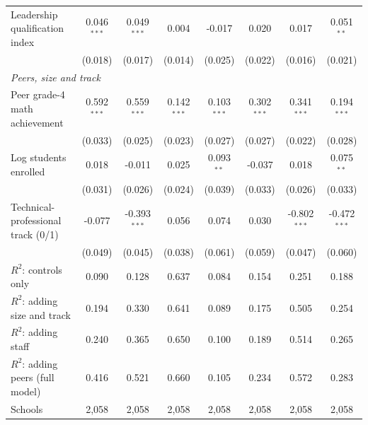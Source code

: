 \begin{table}[!htbp]
{\begin{tabular}{lccccccc}
\quad Leadership qualification index & 0.046$^{***}$ & 0.049$^{***}$ & 0.004 & -0.017 & 0.020 & 0.017 & 0.051$^{**}$ \\
 & (0.018) & (0.017) & (0.014) & (0.025) & (0.022) & (0.016) & (0.021) \\
\multicolumn{8}{l}{\textit{Peers, size and track}} \\
\quad Peer grade-4 math achievement & 0.592$^{***}$ & 0.559$^{***}$ & 0.142$^{***}$ & 0.103$^{***}$ & 0.302$^{***}$ & 0.341$^{***}$ & 0.194$^{***}$ \\
 & (0.033) & (0.025) & (0.023) & (0.027) & (0.027) & (0.022) & (0.028) \\
\quad Log students enrolled & 0.018 & -0.011 & 0.025 & 0.093$^{**}$ & -0.037 & 0.018 & 0.075$^{**}$ \\
 & (0.031) & (0.026) & (0.024) & (0.039) & (0.033) & (0.026) & (0.033) \\
\quad Technical-professional track (0/1) & -0.077 & -0.393$^{***}$ & 0.056 & 0.074 & 0.030 & -0.802$^{***}$ & -0.472$^{***}$ \\
 & (0.049) & (0.045) & (0.038) & (0.061) & (0.059) & (0.047) & (0.060) \\
\midrule
$R^2$: controls only & 0.090 & 0.128 & 0.637 & 0.084 & 0.154 & 0.251 & 0.188 \\
$R^2$: adding size and track & 0.194 & 0.330 & 0.641 & 0.089 & 0.175 & 0.505 & 0.254 \\
$R^2$: adding staff & 0.240 & 0.365 & 0.650 & 0.100 & 0.189 & 0.514 & 0.265 \\
$R^2$: adding peers (full model) & 0.416 & 0.521 & 0.660 & 0.105 & 0.234 & 0.572 & 0.283 \\
Schools & 2,058 & 2,058 & 2,058 & 2,058 & 2,058 & 2,058 & 2,058 \\
\bottomrule
\end{tabular}}
\par\medskip
\footnotesize
\begin{minipage}{\textwidth}

\end{minipage}
\end{table}
